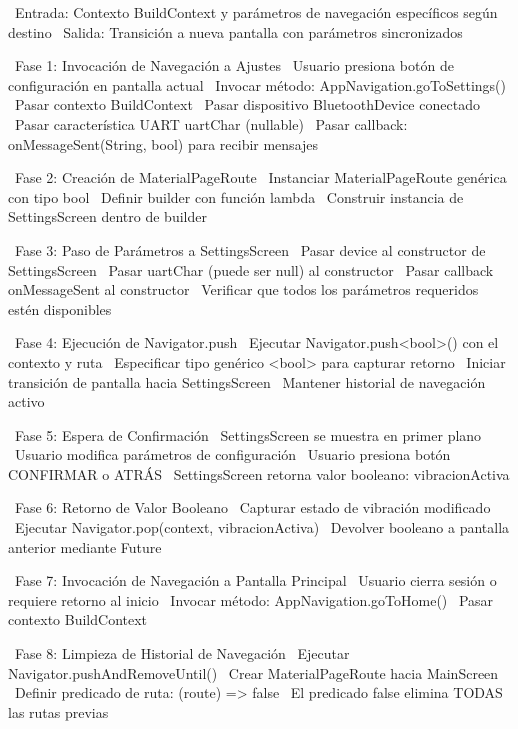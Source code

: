 \begin{algorithmic}[1]
\State~Entrada: Contexto BuildContext y parámetros de navegación específicos según destino
\State~Salida: Transición a nueva pantalla con parámetros sincronizados

\State~Fase 1: Invocación de Navegación a Ajustes
\State~Usuario presiona botón de configuración en pantalla actual
\State~Invocar método: AppNavigation.goToSettings() %
\State~Pasar contexto BuildContext
\State~Pasar dispositivo BluetoothDevice conectado
\State~Pasar característica UART\: uartChar (nullable) %
\State~Pasar callback: onMessageSent(String, bool) para recibir mensajes %

\State~Fase 2: Creación de MaterialPageRoute
\State~Instanciar MaterialPageRoute genérica con tipo bool
\State~Definir builder con función lambda
\State~Construir instancia de SettingsScreen dentro de builder

\State~Fase 3: Paso de Parámetros a SettingsScreen
\State~Pasar device al constructor de SettingsScreen
\State~Pasar uartChar (puede ser null) al constructor
\State~Pasar callback onMessageSent al constructor
\State~Verificar que todos los parámetros requeridos estén disponibles

\State~Fase 4: Ejecución de Navigator.push
\State~Ejecutar Navigator.push<bool>() con el contexto y ruta %
\State~Especificar tipo genérico <bool> para capturar retorno
\State~Iniciar transición de pantalla hacia SettingsScreen
\State~Mantener historial de navegación activo

\State~Fase 5: Espera de Confirmación
\State~SettingsScreen se muestra en primer plano
\State~Usuario modifica parámetros de configuración
\State~Usuario presiona botón CONFIRMAR o ATRÁS
\State~SettingsScreen retorna valor booleano: vibracionActiva

\State~Fase 6: Retorno de Valor Booleano
\State~Capturar estado de vibración modificado
\State~Ejecutar Navigator.pop(context, vibracionActiva) %
\State~Devolver booleano a pantalla anterior mediante Future

\State~Fase 7: Invocación de Navegación a Pantalla Principal
\State~Usuario cierra sesión o requiere retorno al inicio
\State~Invocar método: AppNavigation.goToHome() %
\State~Pasar contexto BuildContext

\State~Fase 8: Limpieza de Historial de Navegación
\State~Ejecutar Navigator.pushAndRemoveUntil() %
\State~Crear MaterialPageRoute hacia MainScreen
\State~Definir predicado de ruta: (route) => false
\State~El predicado false elimina TODAS las rutas previas


\end{algorithmic}

